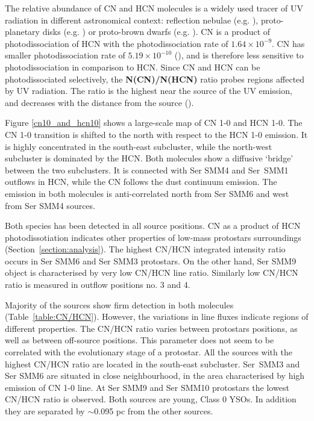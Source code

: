 \documentclass{aa}
\begin{document}
The relative abundance of CN and HCN molecules is a widely used tracer of UV radiation in different
astronomical context: reflection nebulae (e.g. \citealt{Fue95}), proto-planetary disks (e.g.
\citealt{Cha12}) or proto-brown dwarfs (e.g. \citealt{Ria18}). CN is a product of photodissociation of
HCN with the photodissociation rate of $1.64\times10^{-9}$. CN has smaller photodissociation rate of
$5.19\times10^{-10}$ (\citealt{Hea17}), and is therefore less sensitive to photodissociation in comparison to HCN.
Since CN and HCN can be photodissociated selectively, the \textbf{N(CN)/N(HCN)} ratio probes regions
affected by UV radiation. The ratio is the highest near the source of the UV emission, and decreases
with the distance from the source (\citealt{Fue93}). 

Figure \ref{cn10_and_hcn10} shows a large-scale map of CN 1-0 and HCN 1-0. The CN 1-0 transition is shifted to the north with respect to the HCN 1-0 emission. It is
highly concentrated in the south-east subcluster, while the north-west subcluster is dominated by the HCN. Both
molecules show a diffusive ‘bridge’ between the two subclusters. It is connected with Ser SMM4 and
Ser~SMM1 outflows in HCN, while the CN follows the dust continuum emission. The emission in both
molecules is anti-correlated north from Ser SMM6 and west from Ser SMM4 sources. 

Both species has been detected in all source positions. CN as a product of HCN photodissotiation
indicates other properties of low-mass protostars surroundings (Section~\ref{section:analysis}). The highest CN/HCN
integrated intensity ratio occurs in Ser SMM6 and Ser SMM3 protostars. On the other hand, Ser SMM9 object is characterised by very low CN/HCN line ratio.
Similarly low CN/HCN ratio is measured in outflow positions no. 3 and 4.

Majority of the sources show firm detection in both molecules (Table~\ref{table:CN/HCN}). However,
the variations in line fluxes indicate regions of different properties. The CN/HCN ratio varies
between protostars positions, as well as between off-source positions. This parameter does not seem to be correlated with the
evolutionary stage of a protostar. All the sources with the highest CN/HCN ratio are located in the south-east subcluster. Ser~SMM3 and Ser SMM6 are situated in close neighbourhood, in the area characterised
by high emission of CN 1-0 line. At Ser SMM9 and Ser SMM10 protostars the lowest CN/HCN ratio is
observed. Both sources are young, Class 0 YSOs. In addition they are separated by $\sim$0.095 pc from the other sources.
\end{document}
